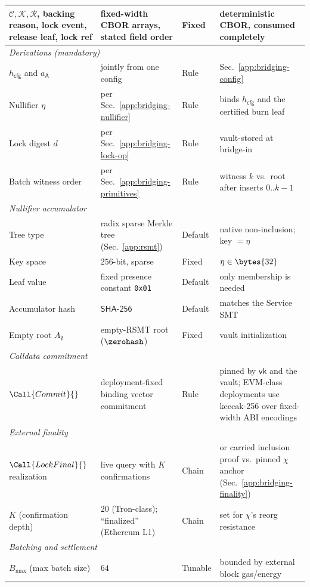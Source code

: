 \begin{longtable}{p{3.0cm}p{4.2cm}p{2.0cm}p{3.4cm}}
$\mathcal{C},\mathcal{K},\mathcal{R}$, backing reason, lock event, release leaf, lock ref & fixed-width CBOR arrays, stated field order & Fixed & deterministic CBOR, consumed completely \\
\hline
\multicolumn{4}{l}{\textit{Derivations (mandatory)}}\\
\hline
$h_\mathsf{cfg}$ and $a_\mathsf{A}$ & jointly from one config & Rule & Sec.~\ref{app:bridging-config} \\
Nullifier $\eta$ & per Sec.~\ref{app:bridging-nullifier} & Rule & binds $h_\mathsf{cfg}$ and the certified burn leaf \\
Lock digest $d$ & per Sec.~\ref{app:bridging-lock-op} & Rule & vault-stored at bridge-in \\
Batch witness order & per Sec.~\ref{app:bridging-primitives} & Rule & witness $k$ vs.\ root after inserts $0..k{-}1$ \\
\hline
\multicolumn{4}{l}{\textit{Nullifier accumulator}}\\
\hline
Tree type & radix sparse Merkle tree (Sec.~\ref{app:rsmt}) & Default & native non-inclusion; key $=\eta$ \\
Key space & $256$-bit, sparse & Fixed & $\eta \in \bytes{32}$ \\
Leaf value & fixed presence constant \texttt{0x01} & Default & only membership is needed \\
Accumulator hash & $\mathsf{SHA\text{-}256}$ & Default & matches the Service SMT \\
Empty root $A_\emptyset$ & empty-RSMT root ($\zerohash$) & Fixed & vault initialization \\
\hline
\multicolumn{4}{l}{\textit{Calldata commitment}}\\
\hline
$\Call{Commit}{}$ & deployment-fixed binding vector commitment & Rule & pinned by $\mathsf{vk}$ and the vault; EVM-class deployments use keccak-256 over fixed-width ABI encodings \\
\hline
\multicolumn{4}{l}{\textit{External finality}}\\
\hline
$\Call{LockFinal}{}$ realization & live query with $K$ confirmations & Chain & or carried inclusion proof vs.\ pinned $\chi$ anchor (Sec.~\ref{app:bridging-finality}) \\
$K$ (confirmation depth) & $20$ (Tron-class); ``finalized'' (Ethereum L1) & Chain & set for $\chi$'s reorg resistance \\
\hline
\multicolumn{4}{l}{\textit{Batching and settlement}}\\
\hline
$B_{\max}$ (max batch size) & $64$ & Tunable & bounded by external block gas/energy \\

\end{longtable}
